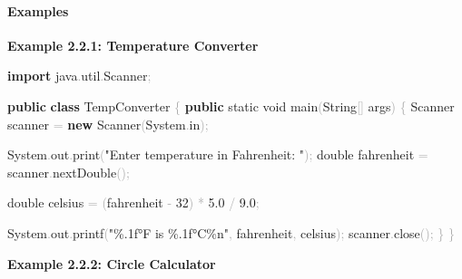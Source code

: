 \documentclass[
  justified,
  openright,
]{tufte-book}
\let\subsection\paragraph
\let\paragraph\paragraph
\newcommand{\KeywordTok}[1]{\textcolor{CodeKeyword}{\textbf{#1}}}  %
\newcommand{\StringTok}[1]{\textcolor{CodeString}{#1}}              %
\newcommand{\CodeNumTok}[1]{\textcolor{CodeNumber}{#1}}             %
\newcommand{\CodeFuncTok}[1]{\textcolor{CodeKeyword}{#1}}           %
\newcommand{\CodeTypeTok}[1]{\textcolor{CodeType}{#1}}              %
\newcommand{\CodeAccentTok}[1]{\textcolor{CodeAccent}{#1}}          %
\newcommand{\OperatorTok}[1]{\textcolor{DarkGray}{#1}}              %
\newenvironment{Shaded}{%
  \begin{mdframed}[style=TufteCode]%
}{%
  \end{mdframed}%
}
\let\subsection\paragraph
\let\paragraph\paragraph
\begin{document}
\subsection{Examples}\label{examples-22}

\textbf{Example 2.2.1: Temperature Converter}

\begin{Shaded}
\begin{Highlighting}[]
\KeywordTok{import} \CodeAccentTok{java}\OperatorTok{.}\CodeAccentTok{util}\OperatorTok{.}\CodeAccentTok{Scanner}\OperatorTok{;}
 
\KeywordTok{public} \KeywordTok{class} TempConverter \OperatorTok{\{}
    \KeywordTok{public} \CodeTypeTok{static} \CodeTypeTok{void} \CodeFuncTok{main}\OperatorTok{(}String\OperatorTok{[]} args\OperatorTok{)} \OperatorTok{\{}
        Scanner scanner \OperatorTok{=} \KeywordTok{new} Scanner\OperatorTok{(}System\OperatorTok{.}\CodeFuncTok{in}\OperatorTok{);}
 
        System\OperatorTok{.}\CodeFuncTok{out}\OperatorTok{.}\CodeFuncTok{print}\OperatorTok{(}\StringTok{"Enter temperature in Fahrenheit: "}\OperatorTok{);}
        \CodeTypeTok{double} fahrenheit \OperatorTok{=} scanner\OperatorTok{.}\CodeFuncTok{nextDouble}\OperatorTok{();}
 
        \CodeTypeTok{double} celsius \OperatorTok{=} \OperatorTok{(}fahrenheit \OperatorTok{{-}} \CodeNumTok{32}\OperatorTok{)} \OperatorTok{*} \CodeNumTok{5.0} \OperatorTok{/} \CodeNumTok{9.0}\OperatorTok{;}
 
        System\OperatorTok{.}\CodeFuncTok{out}\OperatorTok{.}\CodeFuncTok{printf}\OperatorTok{(}\StringTok{"}\StringTok{\%.1f}\StringTok{°F is }\StringTok{\%.1f}\StringTok{°C}\StringTok{\%n}\StringTok{"}\OperatorTok{,} fahrenheit\OperatorTok{,} celsius\OperatorTok{);}
        scanner\OperatorTok{.}\CodeFuncTok{close}\OperatorTok{();}
    \OperatorTok{\}}
\OperatorTok{\}}
\end{Highlighting}
\end{Shaded}

\textbf{Example 2.2.2: Circle Calculator}
\end{document}
